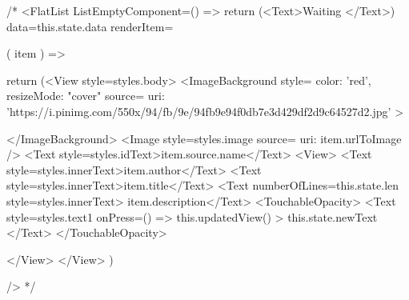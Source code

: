 {/* <FlatList
            ListEmptyComponent={() => {
              return (<Text>Waiting
              </Text>)
            }}
            data={this.state.data}
            renderItem={({ item }) => {
              return (<View style={styles.body}>
                <ImageBackground style={{ color: 'red', resizeMode: "cover" }}
                  source={{ uri: 'https://i.pinimg.com/550x/94/fb/9e/94fb9e94f0db7e3d429df2d9c64527d2.jpg' }}>

                </ImageBackground>
                <Image style={styles.image}
                  source={{ uri: item.urlToImage }}
                />
                <Text style={styles.idText}>{item.source.name}</Text>
                <View>
                  <Text style={styles.innerText}>{item.author}</Text>
                  <Text style={styles.innerText}>{item.title}</Text>
                  <Text numberOfLines={this.state.len}
                    style={styles.innerText}>
                    {item.description}</Text>
                  <TouchableOpacity>
                    <Text style={styles.text1} onPress={() => {
                      this.updatedView()
                    }}>
                      {this.state.newText}
                    </Text>
                  </TouchableOpacity>

                </View>
              </View>
              )
            }}
          /> */}